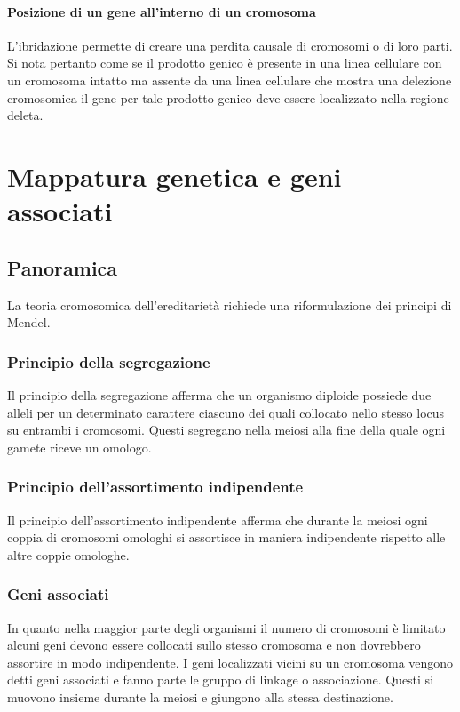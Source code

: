 			\paragraph{Posizione di un gene all'interno di un cromosoma}
			L'ibridazione permette di creare una perdita causale di cromosomi o di loro parti.
			Si nota pertanto come se il prodotto genico \`e presente in una linea cellulare con un cromosoma intatto ma assente da una linea cellulare che mostra una delezione cromosomica il gene per tale prodotto genico deve essere localizzato nella regione deleta.

\section{Mappatura genetica e geni associati}

	\subsection{Panoramica}
	La teoria cromosomica dell'ereditariet\`a richiede una riformulazione dei principi di Mendel.

		\subsubsection{Principio della segregazione}
		Il principio della segregazione afferma che un organismo diploide possiede due alleli per un determinato carattere ciascuno dei quali collocato nello stesso locus su entrambi i cromosomi.
		Questi segregano nella meiosi alla fine della quale ogni gamete riceve un omologo.

		\subsubsection{Principio dell'assortimento indipendente}
		Il principio dell'assortimento indipendente afferma che durante la meiosi ogni coppia di cromosomi omologhi si assortisce in maniera indipendente rispetto alle altre coppie omologhe.

		\subsubsection{Geni associati}
		In quanto nella maggior parte degli organismi il numero di cromosomi \`e limitato alcuni geni devono essere collocati sullo stesso cromosoma e non dovrebbero assortire in modo indipendente.
		I geni localizzati vicini su un cromosoma vengono detti geni associati e fanno parte le gruppo di linkage o associazione.
		Questi si muovono insieme durante la meiosi e giungono alla stessa destinazione.

